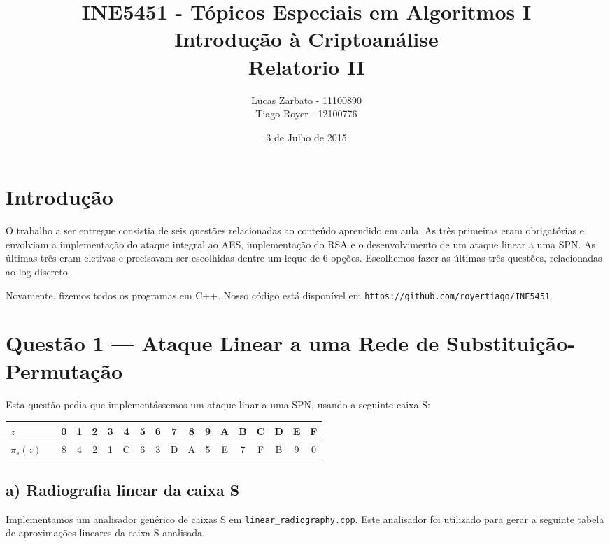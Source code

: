 \documentclass{article}
\title{
    INE5451 - Tópicos Especiais em Algoritmos I \\
    Introdução à Criptoanálise \\
    Relatorio II
}
\author{
    Lucas Zarbato - 11100890\\
    Tiago Royer - 12100776
}
\date{3 de Julho de 2015}
\begin{document}
\maketitle

\section{Introdução}

O trabalho a ser entregue consistia de seis questões
relacionadas ao conteúdo aprendido em aula.
As três primeiras eram obrigatórias
e envolviam a implementação do ataque integral ao AES,
implementação do RSA
e o desenvolvimento de um ataque linear a uma SPN.
As últimas três eram eletivas e precisavam ser escolhidas
dentre um leque de 6 opções.
Escolhemos fazer as últimas três questões, relacionadas ao log discreto.

Novamente, fizemos todos os programas em C++.
Nosso código está disponível em \texttt{https://github.com/royertiago/INE5451}.

\section{Questão 1 --- Ataque Linear a uma Rede de Substituição-Permutação}

Esta questão pedia que implementássemos um ataque linar a uma SPN,
usando a seguinte caixa-S:

\begin{tabular}{l l *{16}c}
    \toprule
    $z$ & \quad & 0 & 1 & 2 & 3 & 4 & 5 & 6 & 7 & 8 & 9 & A & B & C & D & E & F \\
    \midrule
    $\pi_s(z)$ && 8 & 4 & 2 & 1 & C & 6 & 3 & D & A & 5 & E & 7 & F & B & 9 & 0 \\
    \bottomrule
\end{tabular}

\subsection{a) Radiografia linear da caixa S}

Implementamos um analisador genérico de caixas S em \verb"linear_radiography.cpp".
Este analisador foi utilizado para gerar a seguinte tabela de aproximações lineares
da caixa S analisada.
\end{document}
